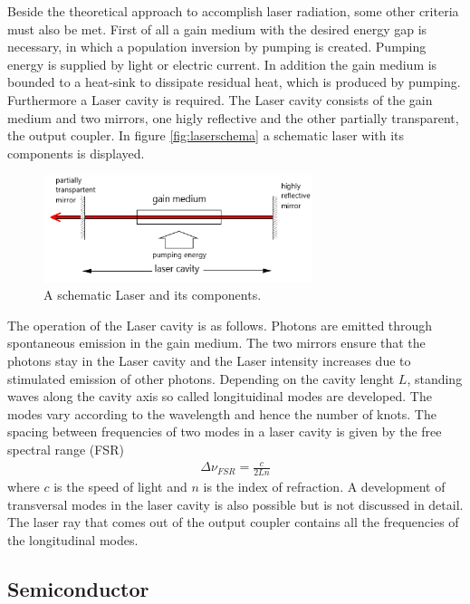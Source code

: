 Beside the theoretical approach to
accomplish laser radiation, some other criteria
must also be met.
First of all a gain medium with the desired
energy gap is necessary, in which
a population inversion by pumping is created.
Pumping energy is supplied by light or electric current.
In addition the gain medium is bounded to a heat-sink
to dissipate residual heat, which is produced by pumping.
Furthermore a Laser cavity is required.
The Laser cavity consists of the gain medium and two
mirrors, one higly reflective and the other
partially transparent,
the output coupler.
In figure \ref{fig:laserschema}
a schematic laser with its components is displayed.
\begin{figure}
\centering
\includegraphics[width=0.7\textwidth]{laserkonzept.png}
\caption{A schematic Laser and its components.
\cite{wiki_diode}}
\label{fig:equi}
\end{figure}
The operation of the Laser cavity is as follows.
Photons are emitted through spontaneous emission
in the gain medium. The two mirrors
ensure that the photons stay in the Laser cavity
and the Laser intensity increases due to
stimulated emission of other photons.
Depending on the cavity lenght $L$,
standing waves along the cavity axis so called longituidinal modes
are developed.
The modes vary according to the wavelength and hence
the number of knots. The spacing
between frequencies of two modes in a laser
cavity is given by the free spectral range (FSR)
\begin{align}
\Delta \nu_{FSR} = \frac{c}{2Ln}
\end{align}
where $c$ is the speed of light and $n$ is
the index of refraction.
A development of transversal modes in the laser cavity
is also possible but is not discussed in detail.
The laser ray that comes out of the output coupler
contains all the frequencies of the longitudinal modes.

\subsection{Semiconductor}
\label{subsec:Semiconductor}

